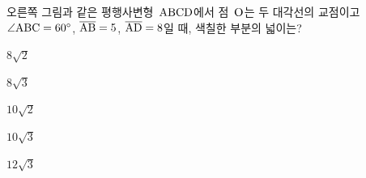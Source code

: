 \noindent\begin{minipage}[t]{0.58\linewidth}\vspace{0pt}\raggedright 오른쪽 그림과 같은 평행사변형~$\mathrm{ABCD}$에서 점~$\mathrm{O}$는 두 대각선의 교점이고 $\angle\mathrm{ABC}=60^\circ$, $\overline{\mathrm{AB}}=5$, $\overline{\mathrm{AD}}=8$일 때, 색칠한 부분의 넓이는?\end{minipage}\hfill\begin{minipage}[t]{0.4\linewidth}\vspace{0pt}\centering \resizebox{\ifdim\width>\linewidth\linewidth\else\width\fi}{!}{}\end{minipage}\par
\begin{choices32}{\rule[-3ex]{0pt}{8ex}$8\sqrt{2}$}{\rule[-3ex]{0pt}{8ex}$8\sqrt{3}$}{\rule[-3ex]{0pt}{8ex}$10\sqrt{2}$}{\rule[-3ex]{0pt}{8ex}$10\sqrt{3}$}{\rule[-3ex]{0pt}{8ex}$12\sqrt{3}$}\end{choices32}

